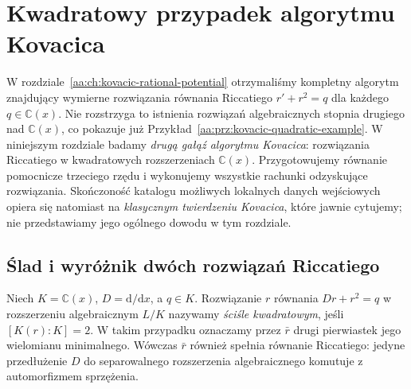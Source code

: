 \chapter{Kwadratowy przypadek algorytmu Kovacica}
\label{aa:ch:kovacic-quadratic}

W rozdziale~\ref{aa:ch:kovacic-rational-potential}
otrzymaliśmy kompletny algorytm znajdujący
wymierne rozwiązania równania Riccatiego
$r'+r^2=q$ dla każdego $q\in\mathbb C(x)$.
Nie rozstrzyga to istnienia rozwiązań
algebraicznych stopnia drugiego nad
$\mathbb C(x)$, co pokazuje już
Przykład~\ref{aa:prz:kovacic-quadratic-example}.
W niniejszym rozdziale badamy
\emph{drugą gałąź algorytmu Kovacica}:
rozwiązania Riccatiego w kwadratowych
rozszerzeniach $\mathbb C(x)$.
Przygotowujemy równanie pomocnicze
trzeciego rzędu i wykonujemy wszystkie
rachunki odzyskujące rozwiązania.
Skończoność katalogu możliwych
lokalnych danych wejściowych
opiera się natomiast na
\emph{klasycznym twierdzeniu Kovacica},
które jawnie cytujemy; nie przedstawiamy
jego ogólnego dowodu w tym rozdziale.

\section{Ślad i wyróżnik dwóch rozwiązań Riccatiego}

\begin{definicja}
\label{aa:def:kov2-quadratic}
Niech $K=\mathbb C(x)$, $D=\mathrm d/\mathrm dx$,
a $q\in K$. Rozwiązanie $r$
równania $Dr+r^2=q$ w rozszerzeniu
algebraicznym $L/K$ nazywamy
\emph{ściśle kwadratowym}, jeśli
$[K(r):K]=2$. W takim przypadku
oznaczamy przez $\bar r$ drugi
pierwiastek jego wielomianu minimalnego.
Wówczas $\bar r$ również spełnia
równanie Riccatiego: jedyne
przedłużenie $D$ do
separowalnego rozszerzenia
algebraicznego komutuje z
automorfizmem sprzężenia.
\end{definicja}


